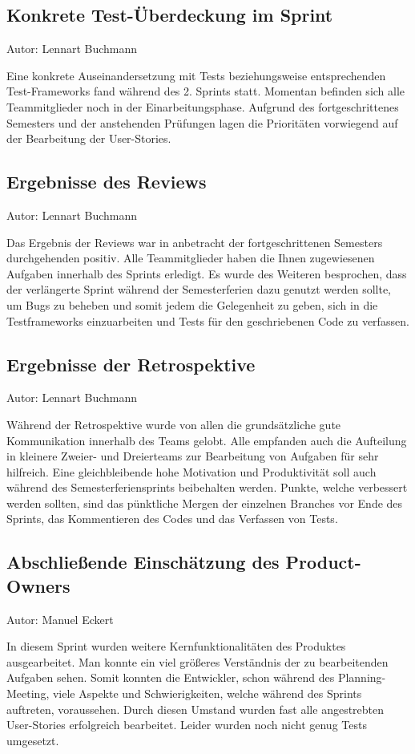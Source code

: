\subsection{Konkrete Test-Überdeckung im Sprint}
{\small Autor: Lennart Buchmann}

Eine konkrete Auseinandersetzung mit Tests beziehungsweise entsprechenden Test-Frameworks fand während des 2. Sprints statt. Momentan befinden sich alle Teammitglieder noch in der Einarbeitungsphase. Aufgrund des fortgeschrittenes Semesters und der anstehenden Prüfungen lagen die Prioritäten vorwiegend auf der Bearbeitung der User-Stories. 


\subsection{Ergebnisse des Reviews}
{\small Autor: Lennart Buchmann}

Das Ergebnis der Reviews war in anbetracht der fortgeschrittenen Semesters durchgehenden positiv. Alle Teammitglieder haben die Ihnen zugewiesenen Aufgaben innerhalb des Sprints erledigt. 
Es wurde des Weiteren besprochen, dass der verlängerte Sprint während der Semesterferien dazu genutzt werden sollte, um Bugs zu beheben und somit jedem die Gelegenheit zu geben, sich in die Testframeworks einzuarbeiten und Tests für den geschriebenen Code zu verfassen.


\subsection{Ergebnisse der Retrospektive}
{\small Autor:  Lennart Buchmann}

Während der Retrospektive wurde von allen die grundsätzliche gute Kommunikation innerhalb des Teams gelobt. Alle empfanden auch die Aufteilung in kleinere Zweier- und Dreierteams zur Bearbeitung von Aufgaben für sehr hilfreich.  Eine gleichbleibende hohe Motivation und Produktivität soll auch während des Semesterferiensprints beibehalten werden. Punkte, welche verbessert werden sollten, sind das pünktliche Mergen der einzelnen Branches vor Ende des Sprints, das Kommentieren des Codes und das Verfassen von Tests. 


\subsection{Abschließende Einschätzung des Product-Owners}
{\small Autor: Manuel Eckert}

In diesem Sprint wurden weitere Kernfunktionalitäten des Produktes ausgearbeitet. Man konnte ein viel größeres Verständnis der zu bearbeitenden Aufgaben sehen. Somit konnten die Entwickler, schon während des Planning-Meeting, viele Aspekte und Schwierigkeiten, welche während des Sprints auftreten, voraussehen. Durch diesen Umstand wurden fast alle angestrebten User-Stories erfolgreich bearbeitet. Leider wurden noch nicht genug Tests umgesetzt.

